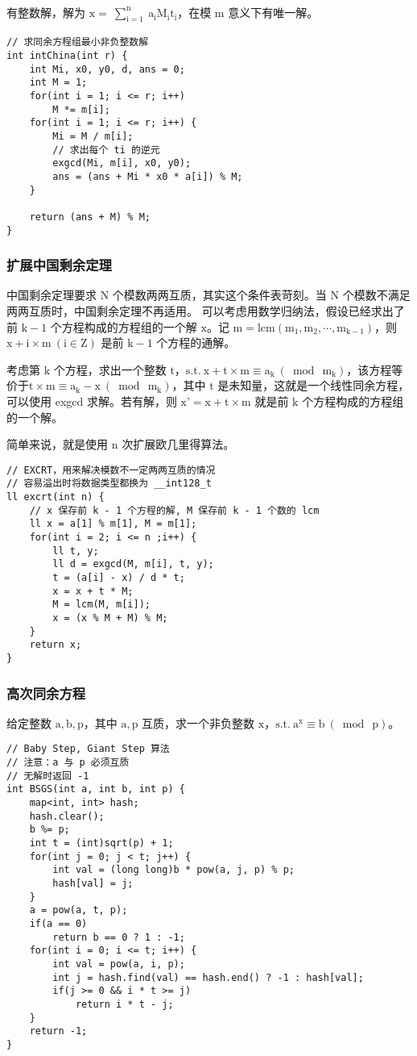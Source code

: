 \documentclass[UTF8]{article}
\begin{document}
有整数解，解为 $\mathrm{x = \begin{matrix} \sum_{i = 1}^n \end{matrix} a_iM_it_i}$，在模 $\mathrm{m}$ 意义下有唯一解。
\begin{lstlisting}[caption=中国剩余定理]
// 求同余方程组最小非负整数解
int intChina(int r) {
	int Mi, x0, y0, d, ans = 0;
	int M = 1;
	for(int i = 1; i <= r; i++)
		M *= m[i];
	for(int i = 1; i <= r; i++) {
		Mi = M / m[i];
		// 求出每个 ti 的逆元
		exgcd(Mi, m[i], x0, y0);
		ans = (ans + Mi * x0 * a[i]) % M;
	}
	
	return (ans + M) % M;
}
\end{lstlisting}


\subsubsection{扩展中国剩余定理}
中国剩余定理要求 $\mathrm{N}$ 个模数两两互质，其实这个条件表苛刻。当 $\mathrm{N}$ 个模数不满足两两互质时，中国剩余定理不再适用。
可以考虑用数学归纳法，假设已经求出了前 $\mathrm{k-1}$ 个方程构成的方程组的一个解 $\mathrm{x}$。记 $\mathrm{m = lcm(m_1, m_2, \cdots, m_{k - 1})}$，则 $\mathrm{x + i \times m\ (i \in Z)}$ 是前 $\mathrm{k - 1}$ 个方程的通解。

考虑第 $\mathrm{k}$ 个方程，求出一个整数 $\mathrm{t}$，$\mathrm{s.t.\ x + t \times m \equiv a_k \ (\bmod \ m_k)}$，该方程等价于$\mathrm{t \times m \equiv a_k - x \ (\bmod \ m_k)}$，其中 $\mathrm{t}$ 是未知量，这就是一个线性同余方程，可以使用 exgcd 求解。若有解，则 $\mathrm{x’ = x + t \times m}$ 就是前 $\mathrm{k}$ 个方程构成的方程组的一个解。

简单来说，就是使用 $\mathrm{n}$ 次扩展欧几里得算法。
\begin{lstlisting}[caption=扩展中国剩余定理]
// EXCRT，用来解决模数不一定两两互质的情况
// 容易溢出时将数据类型都换为 __int128_t
ll excrt(int n) {
	// x 保存前 k - 1 个方程的解, M 保存前 k - 1 个数的 lcm
	ll x = a[1] % m[1], M = m[1];
	for(int i = 2; i <= n ;i++) {
		ll t, y;
		ll d = exgcd(M, m[i], t, y);
		t = (a[i] - x) / d * t;
		x = x + t * M;
		M = lcm(M, m[i]);
		x = (x % M + M) % M;
	}
	return x;
}
\end{lstlisting}


\subsubsection{高次同余方程}
给定整数 $\mathrm{a,b,p}$，其中 $\mathrm{a,p}$ 互质，求一个非负整数 $\mathrm{x}$，$\mathrm{s.t. \ a^x \equiv b\ (\bmod \ p)}$。
\begin{lstlisting}[caption=BSGS 求解高次同余方程]
// Baby Step, Giant Step 算法
// 注意：a 与 p 必须互质
// 无解时返回 -1
int BSGS(int a, int b, int p) {
	map<int, int> hash;
	hash.clear();
	b %= p;
	int t = (int)sqrt(p) + 1;
	for(int j = 0; j < t; j++) {
		int val = (long long)b * pow(a, j, p) % p;
		hash[val] = j;
	}
	a = pow(a, t, p);
	if(a == 0)
		return b == 0 ? 1 : -1;
	for(int i = 0; i <= t; i++) {
		int val = pow(a, i, p);
		int j = hash.find(val) == hash.end() ? -1 : hash[val];
		if(j >= 0 && i * t >= j)
			return i * t - j;
	}
	return -1;
}
\end{lstlisting}
\end{document}
